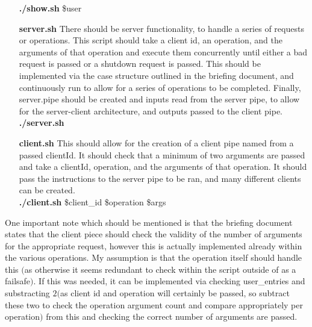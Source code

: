 \documentclass[11pt]{article}
\theoremstyle{plain}
\theoremstyle{definition}
\begin{document}
\begin{itemize}
	\textbf{./show.sh} \$user
	\item[\textbf{server.sh}] There should be server functionality, to handle a series of requests or operations. This script should take a client id, an operation, and the arguments of that operation and execute them concurrently until either a bad request is passed or a shutdown request is passed. This should be implemented via the case structure outlined in the briefing document, and continuously run to allow for a series of operations to be completed. Finally, server.pipe should be created and inputs read from the server pipe, to allow for the server-client architecture, and outputs passed to the client pipe.\\
	\textbf{./server.sh}
	\item[\textbf{client.sh}] This should allow for the creation of a client pipe named from a passed clientId. It should check that a minimum of two arguments are passed and take a clientId, operation, and the arguments of that operation. It should pass the instructions to the server pipe to be ran, and many different clients can be created.\\
	\textbf{./client.sh} \$client\_id \$operation \$args
\end{itemize}
One important note which should be mentioned is that the briefing document states that the client piece should check the validity of the number of arguments for the appropriate request, however this is actually implemented already within the various operations. My assumption is that the operation itself should handle this $($as otherwise it seems redundant to check within the script outside of as a failsafe$)$. If this was needed, it can be implemented via checking user\_entries and substracting $2 ($as client id and operation will certainly be passed, so subtract these two to check the operation argument count and compare appropriately per operation$)$ from this and checking the correct number of arguments are passed.
\pagebreak
\end{document}
